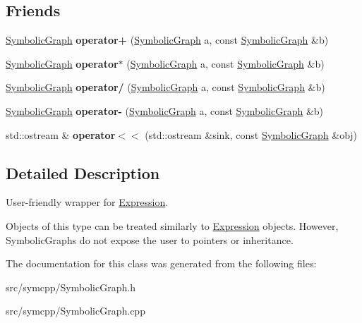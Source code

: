 \subsection*{Friends}
\begin{DoxyCompactItemize}
\item 
\hyperlink{classSymbolicGraph}{Symbolic\+Graph} {\bfseries operator+} (\hyperlink{classSymbolicGraph}{Symbolic\+Graph} a, const \hyperlink{classSymbolicGraph}{Symbolic\+Graph} \&b)\hypertarget{classSymbolicGraph_aefac47289460c9fb34141bd2a20809f1}{}\label{classSymbolicGraph_aefac47289460c9fb34141bd2a20809f1}

\item 
\hyperlink{classSymbolicGraph}{Symbolic\+Graph} {\bfseries operator$\ast$} (\hyperlink{classSymbolicGraph}{Symbolic\+Graph} a, const \hyperlink{classSymbolicGraph}{Symbolic\+Graph} \&b)\hypertarget{classSymbolicGraph_a895a3848ca9605036f07e73412b8493b}{}\label{classSymbolicGraph_a895a3848ca9605036f07e73412b8493b}

\item 
\hyperlink{classSymbolicGraph}{Symbolic\+Graph} {\bfseries operator/} (\hyperlink{classSymbolicGraph}{Symbolic\+Graph} a, const \hyperlink{classSymbolicGraph}{Symbolic\+Graph} \&b)\hypertarget{classSymbolicGraph_a75795007fbed7da119eb3ed6838c341e}{}\label{classSymbolicGraph_a75795007fbed7da119eb3ed6838c341e}

\item 
\hyperlink{classSymbolicGraph}{Symbolic\+Graph} {\bfseries operator-\/} (\hyperlink{classSymbolicGraph}{Symbolic\+Graph} a, const \hyperlink{classSymbolicGraph}{Symbolic\+Graph} \&b)\hypertarget{classSymbolicGraph_af0e10f19ffb94557b68c8f10b110f030}{}\label{classSymbolicGraph_af0e10f19ffb94557b68c8f10b110f030}

\item 
std\+::ostream \& {\bfseries operator$<$$<$} (std\+::ostream \&sink, const \hyperlink{classSymbolicGraph}{Symbolic\+Graph} \&obj)\hypertarget{classSymbolicGraph_a653fedc6ac7ca152b1d40ad887b9af42}{}\label{classSymbolicGraph_a653fedc6ac7ca152b1d40ad887b9af42}

\end{DoxyCompactItemize}


\subsection{Detailed Description}
User-\/friendly wrapper for \hyperlink{classExpression}{Expression}. 

Objects of this type can be treated similarly to \hyperlink{classExpression}{Expression} objects. However, Symbolic\+Graphs do not expose the user to pointers or inheritance. 

The documentation for this class was generated from the following files\+:\begin{DoxyCompactItemize}
\item 
src/symcpp/Symbolic\+Graph.\+h\item 
src/symcpp/Symbolic\+Graph.\+cpp\end{DoxyCompactItemize}
